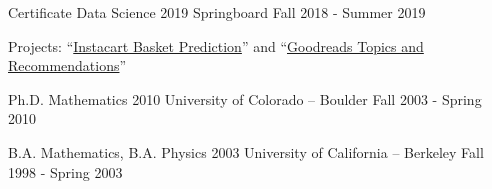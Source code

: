 

\begin{cventries}

  \cventry
    {Certificate Data Science 2019} %
    {Springboard} %
    {} %
    {Fall 2018 - Summer 2019} %
    {
      \begin{cvitems} %
        \item {Projects: ``{\href{https://github.com/eitamaton/instacart}{Instacart Basket Prediction}}'' and ``{\href{https://github.com/eitamaton/goodreads}{Goodreads Topics and Recommendations}}''}
      \end{cvitems}
    }

  \cventry
    {Ph.D. Mathematics 2010} %
    {University of Colorado -- Boulder} %
    {} %
    {Fall 2003 - Spring 2010} %
    {
    }
    \vspace{-5mm}

  \cventry
    {B.A. Mathematics, B.A. Physics 2003} %
    {University of California -- Berkeley} %
    {} %
    {Fall 1998 - Spring 2003} %
    {}
    \vspace{-5mm}
\end{cventries}
